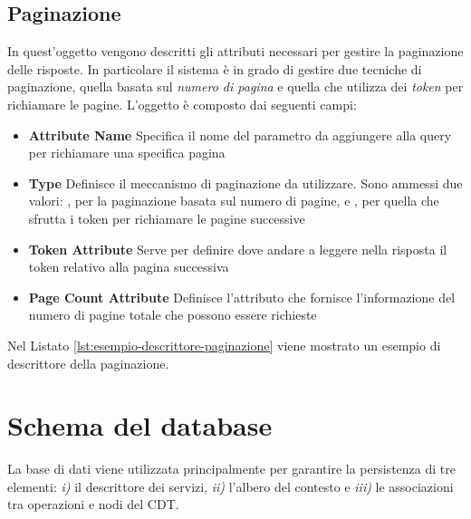 

\subsection{Paginazione\label{sec:descrittore-paginazione}}

In quest'oggetto vengono descritti gli attributi necessari per gestire la paginazione delle risposte. In particolare il sistema è in grado di gestire due tecniche di paginazione, quella basata sul \emph{numero di pagina} e quella che utilizza dei \emph{token} per richiamare le pagine. L'oggetto è composto dai seguenti campi:

\begin{itemize}
	\item \textbf{Attribute Name} Specifica il nome del parametro da aggiungere alla query per richiamare una specifica pagina
	\item \textbf{Type} Definisce il meccanismo di paginazione da utilizzare. Sono ammessi due valori: , per la paginazione basata sul numero di pagine, e , per quella che sfrutta i token per richiamare le pagine successive
	\item \textbf{Token Attribute} Serve per definire dove andare a leggere nella risposta il token relativo alla pagina successiva
	\item \textbf{Page Count Attribute} Definisce l'attributo che fornisce l'informazione del numero di pagine totale che possono essere richieste
\end{itemize}

Nel Listato \ref{lst:esempio-descrittore-paginazione} viene mostrato un esempio di descrittore della paginazione.



\section{Schema del database\label{sec:schema-database}}

La base di dati viene utilizzata principalmente per garantire la persistenza di tre elementi: \emph{i)} il descrittore dei servizi, \emph{ii)} l'albero del contesto e \emph{iii)} le associazioni tra operazioni e nodi del CDT.

